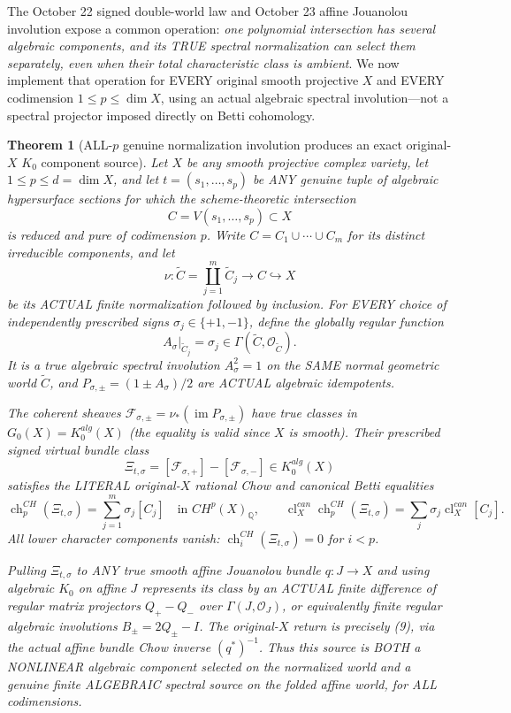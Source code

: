 \documentclass[11pt]{article}
\newtheorem{theorem}{Theorem}
\begin{document}
The October 22 signed double-world law and October 23 affine
Jouanolou involution expose a common operation:
\emph{one polynomial intersection has several algebraic
components, and its TRUE spectral normalization can select them
separately, even when their total characteristic class is ambient}.
We now implement that operation for EVERY original smooth
projective $X$ and EVERY codimension $1\le p\le\dim X$,
using an actual algebraic spectral involution---not a
spectral projector imposed directly on Betti cohomology.

\begin{theorem}[ALL-$p$ genuine normalization involution produces an exact original-$X$ $K_0$ component source]
Let $X$ be any smooth projective complex
variety, let $1\le p\le d=\dim X$, and let
$t=(s_1,\ldots,s_p)$ be ANY genuine tuple of
algebraic hypersurface sections for which the
scheme-theoretic intersection
\[
 C=V(s_1,\ldots,s_p)\subset X
\]
is \emph{reduced and pure of codimension $p$}.
Write $C=C_1\cup\cdots\cup C_m$ for its distinct
irreducible components, and let
\[
 \nu:\widetilde C
     =\coprod_{j=1}^{m}\widetilde C_j
  \longrightarrow C\hookrightarrow X
\]
be its ACTUAL finite normalization followed by inclusion.
For EVERY choice of independently prescribed signs
$\sigma_j\in\{+1,-1\}$, define the globally regular
function
\[
 A_\sigma|_{\widetilde C_j}=\sigma_j
 \in\Gamma(\widetilde C,\mathcal O_{\widetilde C}).
\]
It is a true algebraic spectral involution
$A_\sigma^2=1$ on the SAME normal geometric world
$\widetilde C$, and
$P_{\sigma,\pm}=(1\pm A_\sigma)/2$ are ACTUAL
algebraic idempotents.

The coherent sheaves
$\mathcal F_{\sigma,\pm}
 =\nu_*(\operatorname{im}P_{\sigma,\pm})$
have true classes in $G_0(X)=K_0^{alg}(X)$
(the equality is valid since $X$ is smooth).
Their prescribed \emph{signed} virtual bundle class
\[
 \Xi_{t,\sigma}
 =[\mathcal F_{\sigma,+}]
  -[\mathcal F_{\sigma,-}]\in K_0^{alg}(X)
\]
satisfies the LITERAL original-$X$ rational
Chow and canonical Betti equalities
\[
 \boxed{
 \operatorname{ch}^{CH}_{p}(\Xi_{t,\sigma})
   =\sum_{j=1}^{m}\sigma_j[C_j]
      \quad\text{in }CH^p(X)_{\mathbb Q},
 \qquad
 \operatorname{cl}^{can}_X
  \operatorname{ch}^{CH}_{p}(\Xi_{t,\sigma})
 =\sum_j\sigma_j\operatorname{cl}^{can}_X[C_j].
 }                                                        \tag{9}
\]
All lower character components vanish:
$\operatorname{ch}^{CH}_i(\Xi_{t,\sigma})=0$
for $i<p$.

Pulling $\Xi_{t,\sigma}$ to ANY true smooth
affine Jouanolou bundle $q:J\to X$
and using algebraic $K_0$ on affine $J$
represents its class by an ACTUAL finite
difference of regular matrix projectors
$Q_+-Q_-$ over $\Gamma(J,\mathcal O_J)$,
or equivalently finite regular algebraic
involutions $B_\pm=2Q_\pm-I$.
The original-$X$ return is precisely (9),
via the actual affine bundle Chow inverse
$(q^*)^{-1}$. Thus this source is BOTH a
NONLINEAR algebraic component selected on
the normalized world and a genuine finite
ALGEBRAIC spectral source on the folded
affine world, for ALL codimensions.
\end{theorem}
\end{document}
